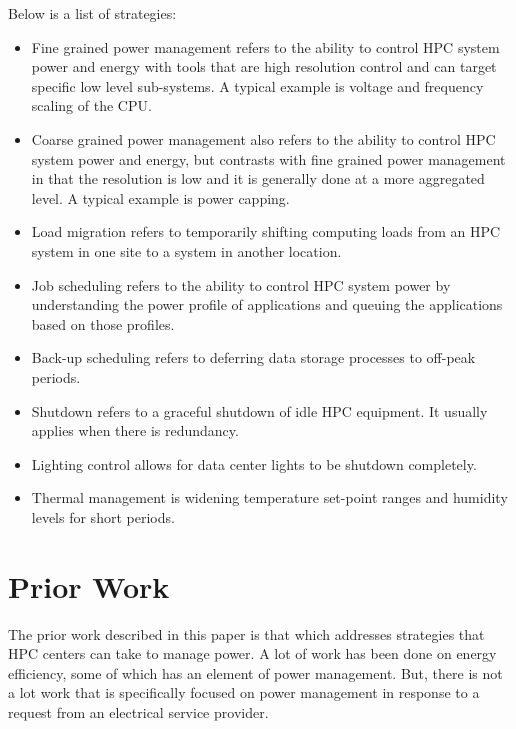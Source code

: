 \documentclass{llncs}
\begin{document}
Below is a list of strategies:

\begin{itemize}
\item Fine grained power management refers to the ability to control HPC system power 
and energy with tools that are high resolution control and can target specific 
low level sub-systems. A typical example is voltage and frequency scaling of the CPU.

\item Coarse grained power management also refers to the ability to control HPC 
system power and energy, but contrasts with fine grained power management in 
that the resolution is low and it is generally done at a more aggregated level. 
A typical example is power capping.

\item Load migration refers to temporarily shifting computing loads from 
an HPC system in one site to a system in another location.

\item Job scheduling refers to the ability to control HPC system power 
by understanding the power profile of applications and queuing the 
applications based on those profiles.

\item Back-up scheduling refers to deferring data storage processes to off-peak periods.

\item Shutdown refers to a graceful shutdown of idle HPC equipment. It usually 
applies when there is redundancy.

\item Lighting control allows for data center lights to be shutdown completely.

\item Thermal management is widening temperature set-point ranges and 
humidity levels for short periods.
\end{itemize}

\section{Prior Work}

The prior work described in this paper is that which addresses strategies
that HPC centers can take to manage power. A lot of work has been done on
energy efficiency, some of which has an element of power management. But,
there is not a lot work that is specifically focused on power management in
response to a request from an electrical service provider.
\end{document}
